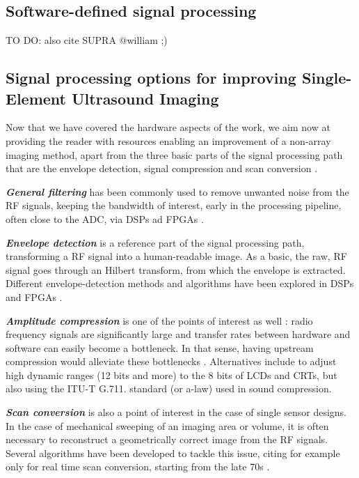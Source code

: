 \documentclass{article}
\begin{document}
\subsection{Software-defined signal processing}

\cite{hager_design_2019,hager_lightprobe:_2019}
TO DO: also cite SUPRA @william ;)

\subsection{Signal processing options for improving Single-Element Ultrasound Imaging}
 
Now that we have covered the hardware aspects of the work, we aim now at providing the reader with resources enabling an improvement of a non-array imaging method, apart from the three basic parts of the signal processing path that are the envelope detection, signal compression and scan conversion \cite{basoglu_computing_1998}.

\textbf{\textit{General filtering}} has been commonly used to remove unwanted noise from the RF signals, keeping the bandwidth of interest, early in the processing pipeline, often close to the ADC, via DSPs ad FPGAs  \cite{assef_modeling_2019,levesque_real-time_2009}.

\textbf{\textit{Envelope detection} } is a reference part  of the signal processing path, transforming a RF signal into a human-readable image. As a basic, the raw, RF signal goes through an Hilbert transform, from which the envelope is extracted. Different envelope-detection methods and algorithms have been explored in DSPs and FPGAs \cite{chang_novel_2007,assef_fpga_2019, assef_modeling_2018}.

\textbf{\textit{Amplitude compression}} is one of the points of interest as well : radio frequency signals are significantly large and transfer rates between hardware and software can easily become a bottleneck. In that sense, having upstream compression would alleviate these bottlenecks \cite{soto-cajiga_fpga-based_2012,akkala_fpga_2014}.  Alternatives include \cite{akkala_compression_2014,boonleelakul_compression_2013} to adjust high dynamic ranges (12 bits and more) to the 8 bits of LCDs and CRTs, but also using the ITU-T G.711. standard (or a-law) used in sound compression.

\textbf{\textit{Scan conversion}} is also a point of interest in the case of single sensor designs. In the case of mechanical sweeping of an imaging area or volume, it is often necessary to reconstruct a geometrically correct image from the RF signals. Several algorithms have been developed to tackle this issue, citing for example only \cite{csany_real-time_2019} for real time scan conversion, starting from the late 70s \cite{ophir_digital_1979}.
\end{document}
